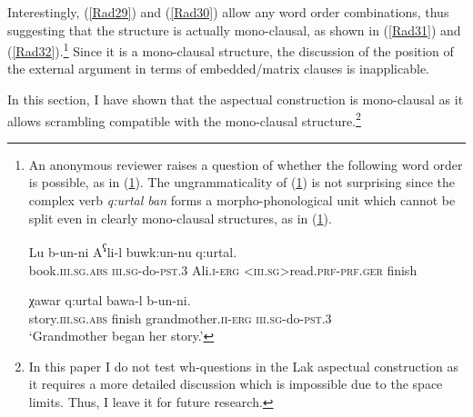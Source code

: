 \documentclass[output=paper]{langscibook}
\begin{document}
Interestingly, (\ref{Rad29}) and (\ref{Rad30}) allow any word order combinations, thus suggesting that the structure is actually mono-clausal, as shown in (\ref{Rad31}) and (\ref{Rad32}).\footnote{An anonymous reviewer raises a question of whether the following word order is possible, as in (\ref{Radi}). The ungrammaticality of (\ref{Radi}) is not surprising since the complex verb \textit{q:urtal ban} forms a morpho-phonological unit which cannot be split even in clearly mono-clausal structures, as in (\ref{Radii}).

\ea\label{Radi}
\gll *Lu b-un-ni A\textsuperscript{ʕ}li-l buwk:un-nu q:urtal.\\
book.\textsc{iii.sg.abs} \textsc{iii.sg}-do-\textsc{pst.3} Ali.\textsc{i-erg}  \textsc{<iii.sg>}read.\textsc{prf-prf.ger} finish\\
\z

\ea\label{Radii}
\gll *χawar q:urtal bawa-l b-un-ni.\\
story.\textsc{iii.sg.abs} finish grandmother.\textsc{ii-erg} 
\textsc{iii.sg}-do-\textsc{pst.3}\\
\glt ‘Grandmother began her story.’
\z
}
Since it is a mono-clausal structure, the discussion of the position of the external argument in terms of embedded/matrix clauses is inapplicable.

\ea\label{Rad31}



\z
\z 

\ea\label{Rad32}



\z 
\z 


\largerpage[2]
In this section, I have shown that the aspectual construction is mono-clausal as it allows scrambling compatible with the mono-clausal structure.\footnote{In this paper I do not test wh-questions in the Lak aspectual construction as it requires a more detailed discussion which is impossible due to the space limits. Thus, I leave it for future research.}
\end{document}

